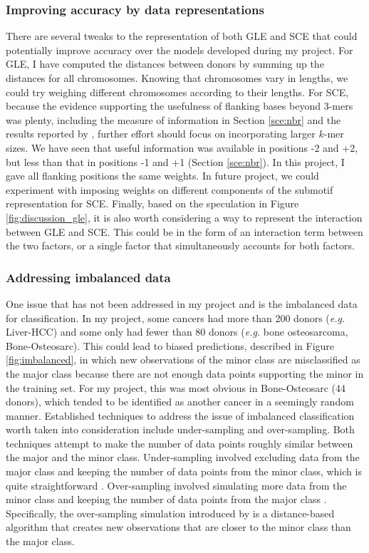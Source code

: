 \subsubsection{Improving accuracy by data representations}
There are several tweaks to the representation of both GLE and SCE that could potentially improve accuracy over the models developed during my project. For GLE, I have computed the distances between donors by summing up the distances for all chromosomes. Knowing that chromosomes vary in lengths, we could try weighing different chromosomes according to their lengths. For SCE, because the evidence supporting the usefulness of flanking bases beyond 3-mers was plenty, including the measure of information in Section \ref{sce:nbr} and the results reported by \citet{Zhang2020}, further effort should focus on incorporating larger $k$-mer sizes. We have seen that useful information was available in positions -2 and +2, but less than that in positions -1 and +1 (Section \ref{sce:nbr}). In this project, I gave all flanking positions the same weights. In future project, we could experiment with imposing weights on different components of the submotif representation for SCE. Finally, based on the speculation in Figure \ref{fig:discussion_gle}, it is also worth considering a way to represent the interaction between GLE and SCE. This could be in the form of an interaction term between the two factors, or a single factor that simultaneously accounts for both factors.

\subsubsection{Addressing imbalanced data}
One issue that has not been addressed in my project and \citet{Jiao2020} is the imbalanced data for classification. In my project, some cancers had more than 200 donors (\textit{e.g.} Liver-HCC) and some only had fewer than 80 donors (\textit{e.g.} bone osteosarcoma, Bone-Osteosarc). This could lead to biased predictions, described in Figure \ref{fig:imbalanced}, in which new observations of the minor class are misclassified as the major class because there are not enough data points supporting the minor in the training set. For my project, this was most obvious in Bone-Osteosarc (44 donors), which tended to be identified as another cancer in a seemingly random manner. Established techniques to address the issue of imbalanced classification worth taken into consideration include under-sampling and over-sampling. Both techniques attempt to make the number of data points roughly similar between the major and the minor class. Under-sampling involved excluding data from the major class and keeping the number of data points from the minor class, which is quite straightforward \citep{Kubat1997AddressingSelection}. Over-sampling involved simulating more data from the minor class and keeping the number of data points from the major class \citep{Chawla2002SMOTE:Technique}. Specifically, the over-sampling simulation introduced by \citet{Chawla2002SMOTE:Technique} is a distance-based algorithm that creates new observations that are closer to the minor class than the major class. 

